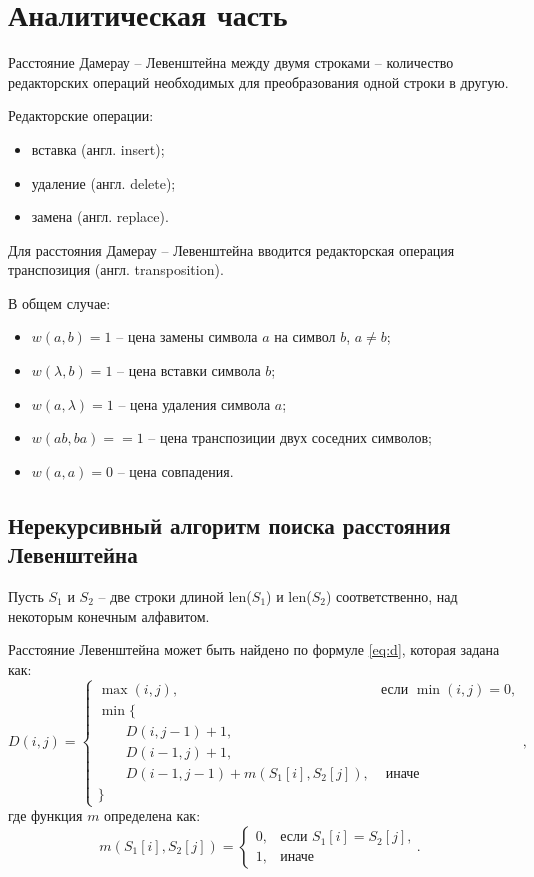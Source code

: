 \chapter{Аналитическая часть}

Расстояние Дамерау -- Левенштейна между двумя строками -- количество редакторских операций необходимых для преобразования одной строки в другую.

Редакторские операции:
\begin{itemize}
	\item вставка (англ. insert);
	\item удаление (англ. delete);
	\item замена (англ. replace).
\end{itemize}

Для расстояния Дамерау -- Левенштейна вводится редакторская операция транспозиция (англ. transposition).

В общем случае:
\begin{itemize}
	\item $w(a,b) = 1$ -- цена замены символа $a$ на символ $b$, $a \neq b$;
	\item $w(\lambda,b) = 1$ -- цена вставки символа $b$;
	\item $w(a,\lambda) = 1$ -- цена удаления символа $a$;
	\item $w(ab, ba) == 1$  -- цена транспозиции двух соседних символов;
	\item $w(a,a) = 0$ -- цена совпадения.
\end{itemize}

\newpage
\section{Нерекурсивный алгоритм поиска расстояния Левенштейна}
Пусть $S_{1}$ и $S_{2}$ -- две строки длиной len($S_{1}$) и len($S_{2}$) соответственно, над некоторым конечным алфавитом.

Расстояние Левенштейна может быть найдено по формуле \ref{eq:d}, которая задана как:
\begin{equation}
	\label{eq:d}
	D(i, j) = \begin{cases}
		\max(i, j), &\text{если }\min(i, j) = 0,\\
		\min \lbrace \\
		\qquad D(i, j-1) + 1,\\
		\qquad D(i-1, j) + 1,\\
		\qquad D(i-1, j-1) + m(S_{1}[i], S_{2}[j]), &\text{ иначе}\\
		\rbrace
	\end{cases},
\end{equation}
где функция $m$ определена как:
\begin{equation}
	\label{eq:m}
	m(S_{1}[i], S_{2}[j]) = \begin{cases}
		0, &\text{если $S_{1}[i] = S_{2}[j]$,}\\
		1, &\text{иначе}
	\end{cases}.
\end{equation}

